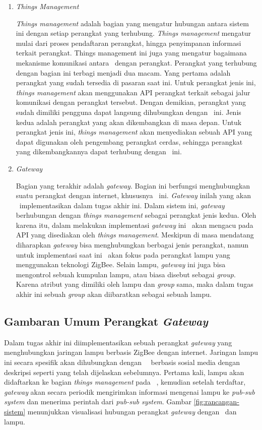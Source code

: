 \begin{enumerate}
	\item \textit{Things Management}
	
	\textit{Things management} adalah bagian yang mengatur hubungan antara sistem ini dengan setiap perangkat yang terhubung. \textit{Things management} mengatur mulai dari proses pendaftaran perangkat, hingga penyimpanan informasi terkait perangkat. Things management ini juga yang mengatur bagaimana mekanisme komunikasi antara \plat~dengan perangkat. Perangkat yang terhubung dengan bagian ini terbagi menjadi dua macam. Yang pertama adalah perangkat yang sudah tersedia di pasaran saat ini. Untuk perangkat jenis ini, \textit{things management} akan menggunakan API perangkat terkait sebagai jalur komunikasi dengan perangkat tersebut. Dengan demikian, perangkat yang sudah dimiliki pengguna dapat langsung dihubungkan dengan \plat~ini. Jenis kedua adalah perangkat yang akan dikembangkan di masa depan. Untuk perangkat jenis ini, \textit{things management} akan menyediakan sebuah API yang dapat digunakan oleh pengembang perangkat cerdas, sehingga perangkat yang dikembangkannya dapat terhubung dengan \plat~ini.
	
	\item \textit{Gateway}
	
	Bagian yang terakhir adalah \textit{gateway}. Bagian ini berfungsi menghubungkan suatu perangkat dengan internet, khususnya \plat~ini. \textit{Gateway} inilah yang akan \saya~implementasikan dalam tugas akhir ini. Dalam sistem ini, \textit{gateway} berhubungan dengan \textit{things management} sebagai perangkat jenis kedua. Oleh karena itu, dalam melakukan implementasi \textit{gateway} ini \saya~akan mengacu pada API yang disediakan oleh \textit{things management}. Meskipun di masa mendatang diharapkan \textit{gateway} bisa menghubungkan berbagai jenis perangkat, namun untuk implementasi saat ini \saya~akan fokus pada perangkat lampu yang menggunakan teknologi ZigBee. Selain lampu, \textit{gateway} ini juga bisa mengontrol sebuah kumpulan lampu, atau biasa disebut sebagai \textit{group}. Karena atribut yang dimiliki oleh lampu dan \textit{group} sama, maka dalam tugas akhir ini sebuah \textit{group} akan diibaratkan sebagai sebuah lampu.
	
\end{enumerate}

\subsection{Gambaran Umum Perangkat \textit{Gateway}}
Dalam tugas akhir ini diimplementasikan sebuah perangkat \textit{gateway} yang menghubungkan jaringan lampu berbasis ZigBee dengan internet. Jaringan lampu ini secara spesifik akan dihubungkan dengan \plat~\iot~berbasis sosial media dengan deskripsi seperti yang telah dijelaskan sebelumnya. Pertama kali, lampu akan didaftarkan ke bagian \textit{things management} pada \plat~, kemudian setelah terdaftar, \textit{gateway} akan secara periodik mengirimkan informasi mengenai lampu ke \textit{pub-sub system} dan menerima perintah dari \textit{pub-sub system}. Gambar \ref{fig:rancangan-sistem} menunjukkan visualisasi hubungan perangkat \textit{gateway} dengan \plat~dan lampu.

